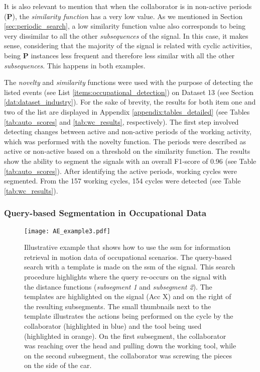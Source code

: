 It is also relevant to mention that when the collaborator is in non-active periods (\textbf{P}), the \textit{similarity function} has a very low value. As we mentioned in Section \ref{sec:periodic_search}, a low similarity function value also corresponds to being very dissimilar to all the other \textit{subsequences} of the signal. In this case, it makes sense, considering that the majority of the signal is related with cyclic activities, being \textbf{P} instances less frequent and therefore less similar with all the other \textit{subsequences}. This happens in both examples.

The \textit{novelty} and \textit{similarity} functions were used with the purpose of detecting the listed events (see List \ref{items:occupational_detection}) on Dataset 13 (see Section \ref{dat:dataset_industry}). For the sake of brevity, the results for both item one and two of the list are displayed in Appendix \ref{appendix:tables_detailed} (see Tables \ref{tab:auto_scores} and \ref{tab:wc_results}, respectively). The first step involved detecting changes between active and non-active periods of the working activity, which was performed with the novelty function. The periods were described as active or non-active based on a threshold on the similarity function. The results show the ability to segment the signals with an overall F1-score of 0.96 (see Table \ref{tab:auto_scores}). After identifying the active periods, working cycles were segmented. From the 157 working cycles, 154 cycles were detected (see Table \ref{tab:wc_results}). 

\subsubsection{Query-based Segmentation in Occupational Data}

\begin{figure}
  \centering
      \texttt{[image: AE\_example3.pdf]}
  \caption{Illustrative example that shows how to use the \gls{ssm} for information retrieval in motion data of occupational scenarios. The query-based search with a template is made on the \gls{ssm} of the signal. This search procedure highlights where the query re-occurs on the signal with the distance functions (\textit{subsegment 1} and \textit{subsegment 2}). The templates are highlighted on the signal (Acc X) and on the right of the resulting subsegments. The small thumbnails next to the template illustrates the actions being performed on the cycle by the collaborator (highlighted in blue) and the tool being used (highlighted in orange). On the first subsegment, the collaborator was reaching over the head and pulling down the working tool, while on the second subsegment, the collaborator was screwing the pieces on the side of the car.}
  \label{fig:ae_example3}
\end{figure}

